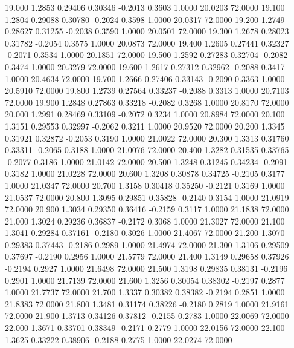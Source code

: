   19.000   1.2853   0.29406   0.30346  -0.2013   0.3603   1.0000  20.0203  72.0000
  19.100   1.2804   0.29088   0.30780  -0.2024   0.3598   1.0000  20.0317  72.0000
  19.200   1.2749   0.28627   0.31255  -0.2038   0.3590   1.0000  20.0501  72.0000
  19.300   1.2678   0.28023   0.31782  -0.2054   0.3575   1.0000  20.0873  72.0000
  19.400   1.2605   0.27441   0.32327  -0.2071   0.3534   1.0000  20.1851  72.0000
  19.500   1.2592   0.27283   0.32704  -0.2082   0.3474   1.0000  20.3279  72.0000
  19.600   1.2617   0.27312   0.32962  -0.2088   0.3417   1.0000  20.4634  72.0000
  19.700   1.2666   0.27406   0.33143  -0.2090   0.3363   1.0000  20.5910  72.0000
  19.800   1.2739   0.27564   0.33237  -0.2088   0.3313   1.0000  20.7103  72.0000
  19.900   1.2848   0.27863   0.33218  -0.2082   0.3268   1.0000  20.8170  72.0000
  20.000   1.2991   0.28469   0.33109  -0.2072   0.3234   1.0000  20.8984  72.0000
  20.100   1.3151   0.29553   0.32997  -0.2062   0.3211   1.0000  20.9520  72.0000
  20.200   1.3345   0.31921   0.32872  -0.2053   0.3190   1.0000  21.0022  72.0000
  20.300   1.3313   0.31760   0.33311  -0.2065   0.3188   1.0000  21.0076  72.0000
  20.400   1.3282   0.31535   0.33765  -0.2077   0.3186   1.0000  21.0142  72.0000
  20.500   1.3248   0.31245   0.34234  -0.2091   0.3182   1.0000  21.0228  72.0000
  20.600   1.3208   0.30878   0.34725  -0.2105   0.3177   1.0000  21.0347  72.0000
  20.700   1.3158   0.30418   0.35250  -0.2121   0.3169   1.0000  21.0537  72.0000
  20.800   1.3095   0.29851   0.35828  -0.2140   0.3154   1.0000  21.0919  72.0000
  20.900   1.3034   0.29350   0.36416  -0.2159   0.3117   1.0000  21.1838  72.0000
  21.000   1.3024   0.29236   0.36837  -0.2172   0.3068   1.0000  21.3027  72.0000
  21.100   1.3041   0.29284   0.37161  -0.2180   0.3026   1.0000  21.4067  72.0000
  21.200   1.3070   0.29383   0.37443  -0.2186   0.2989   1.0000  21.4974  72.0000
  21.300   1.3106   0.29509   0.37697  -0.2190   0.2956   1.0000  21.5779  72.0000
  21.400   1.3149   0.29658   0.37926  -0.2194   0.2927   1.0000  21.6498  72.0000
  21.500   1.3198   0.29835   0.38131  -0.2196   0.2901   1.0000  21.7139  72.0000
  21.600   1.3256   0.30054   0.38302  -0.2197   0.2877   1.0000  21.7737  72.0000
  21.700   1.3337   0.30382   0.38382  -0.2194   0.2851   1.0000  21.8383  72.0000
  21.800   1.3481   0.31174   0.38226  -0.2180   0.2819   1.0000  21.9161  72.0000
  21.900   1.3713   0.34126   0.37812  -0.2155   0.2783   1.0000  22.0069  72.0000
  22.000   1.3671   0.33701   0.38349  -0.2171   0.2779   1.0000  22.0156  72.0000
  22.100   1.3625   0.33222   0.38906  -0.2188   0.2775   1.0000  22.0274  72.0000
